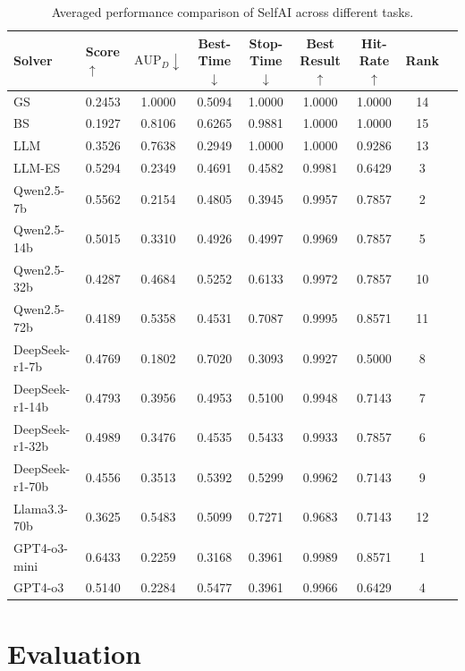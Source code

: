 \begin{table}[h]
    \renewcommand\arraystretch{1.2}
    \setlength{\tabcolsep}{2pt}
    \centering
    \caption{Averaged performance comparison of SelfAI across different tasks.}
    \label{tab:hit}
    \begin{tabular}{llccccccc}
    \toprule
    Solver & Score$\uparrow$ & $\text{AUP}_D\downarrow$ & Best-Time$\downarrow$ & Stop-Time$\downarrow$ & Best Result$\uparrow$ & Hit-Rate$\uparrow$ & Rank \\
    \midrule
    GS & 0.2453 & 1.0000 & 0.5094 & 1.0000 & 1.0000 & 1.0000 & 14 \\
    BS & 0.1927 & 0.8106 & 0.6265 & 0.9881 & 1.0000 & 1.0000 & 15 \\
     LLM & 0.3526 & 0.7638 & 0.2949 & 1.0000 & 1.0000 & 0.9286 & 13 \\
    LLM-ES & 0.5294 & 0.2349 & 0.4691 & 0.4582 & 0.9981 & 0.6429 & 3 \\
    \midrule
    Qwen2.5-7b      & 0.5562 & 0.2154 & 0.4805 & 0.3945 & 0.9957 & 0.7857 & 2 \\
    Qwen2.5-14b     & 0.5015 & 0.3310 & 0.4926 & 0.4997 & 0.9969 & 0.7857 & 5 \\
    Qwen2.5-32b     & 0.4287 & 0.4684 & 0.5252 & 0.6133 & 0.9972 & 0.7857 & 10 \\
    Qwen2.5-72b     & 0.4189 & 0.5358 & 0.4531 & 0.7087 & 0.9995 & 0.8571 & 11 \\
    DeepSeek-r1-7b  & 0.4769 & 0.1802 & 0.7020 & 0.3093 & 0.9927 & 0.5000 & 8 \\
    DeepSeek-r1-14b & 0.4793 & 0.3956 & 0.4953 & 0.5100 & 0.9948 & 0.7143 & 7 \\
    DeepSeek-r1-32b & 0.4989 & 0.3476 & 0.4535 & 0.5433 & 0.9933 & 0.7857 & 6 \\
    DeepSeek-r1-70b & 0.4556 & 0.3513 & 0.5392 & 0.5299 & 0.9962 & 0.7143 & 9 \\
    Llama3.3-70b    & 0.3625 & 0.5483 & 0.5099 & 0.7271 & 0.9683 & 0.7143 & 12 \\
    GPT4-o3-mini    & 0.6433 & 0.2259 & 0.3168 & 0.3961 & 0.9989 & 0.8571 & 1 \\
    GPT4-o3         & 0.5140 & 0.2284 & 0.5477 & 0.3961 & 0.9966 & 0.6429 & 4 \\
    \bottomrule
    \end{tabular}
\end{table}


\section{Evaluation}


